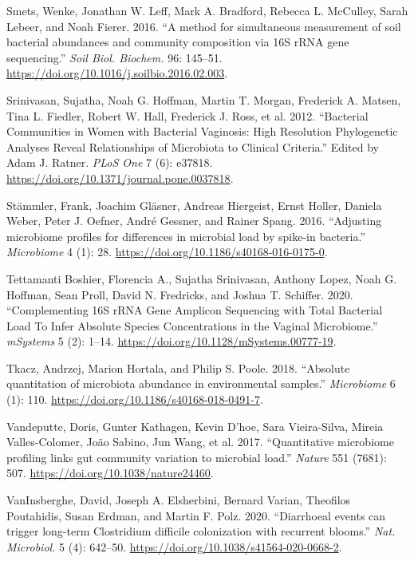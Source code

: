 \documentclass[
]{article}
\newlength{\cslhangindent}
\newlength{\cslentryspacingunit} %
\newenvironment{CSLReferences}[2] %
 {%
  \setlength{\parindent}{0pt}
  \ifodd #1
  \let\oldpar\par
  \def\par{\hangindent=\cslhangindent\oldpar}
  \fi
  \setlength{\parskip}{#2\cslentryspacingunit}
 }%
 {}
\begin{document}
\begin{CSLReferences}{1}{0}
\leavevmode{}%
Smets, Wenke, Jonathan W. Leff, Mark A. Bradford, Rebecca L. McCulley, Sarah Lebeer, and Noah Fierer. 2016. {``{A method for simultaneous measurement of soil bacterial abundances and community composition via 16S rRNA gene sequencing}.''} \emph{Soil Biol. Biochem.} 96: 145--51. \url{https://doi.org/10.1016/j.soilbio.2016.02.003}.

\leavevmode{}%
Srinivasan, Sujatha, Noah G. Hoffman, Martin T. Morgan, Frederick A. Matsen, Tina L. Fiedler, Robert W. Hall, Frederick J. Ross, et al. 2012. {``{Bacterial Communities in Women with Bacterial Vaginosis: High Resolution Phylogenetic Analyses Reveal Relationships of Microbiota to Clinical Criteria}.''} Edited by Adam J. Ratner. \emph{PLoS One} 7 (6): e37818. \url{https://doi.org/10.1371/journal.pone.0037818}.

\leavevmode{}%
Stämmler, Frank, Joachim Gläsner, Andreas Hiergeist, Ernst Holler, Daniela Weber, Peter J. Oefner, André Gessner, and Rainer Spang. 2016. {``{Adjusting microbiome profiles for differences in microbial load by spike-in bacteria}.''} \emph{Microbiome} 4 (1): 28. \url{https://doi.org/10.1186/s40168-016-0175-0}.

\leavevmode{}%
Tettamanti Boshier, Florencia A., Sujatha Srinivasan, Anthony Lopez, Noah G. Hoffman, Sean Proll, David N. Fredricks, and Joshua T. Schiffer. 2020. {``{Complementing 16S rRNA Gene Amplicon Sequencing with Total Bacterial Load To Infer Absolute Species Concentrations in the Vaginal Microbiome}.''} \emph{mSystems} 5 (2): 1--14. \url{https://doi.org/10.1128/mSystems.00777-19}.

\leavevmode{}%
Tkacz, Andrzej, Marion Hortala, and Philip S. Poole. 2018. {``{Absolute quantitation of microbiota abundance in environmental samples}.''} \emph{Microbiome} 6 (1): 110. \url{https://doi.org/10.1186/s40168-018-0491-7}.

\leavevmode{}%
Vandeputte, Doris, Gunter Kathagen, Kevin D'hoe, Sara Vieira-Silva, Mireia Valles-Colomer, João Sabino, Jun Wang, et al. 2017. {``{Quantitative microbiome profiling links gut community variation to microbial load}.''} \emph{Nature} 551 (7681): 507. \url{https://doi.org/10.1038/nature24460}.

\leavevmode{}%
VanInsberghe, David, Joseph A. Elsherbini, Bernard Varian, Theofilos Poutahidis, Susan Erdman, and Martin F. Polz. 2020. {``{Diarrhoeal events can trigger long-term Clostridium difficile colonization with recurrent blooms}.''} \emph{Nat. Microbiol.} 5 (4): 642--50. \url{https://doi.org/10.1038/s41564-020-0668-2}.


\end{CSLReferences}
\end{document}

